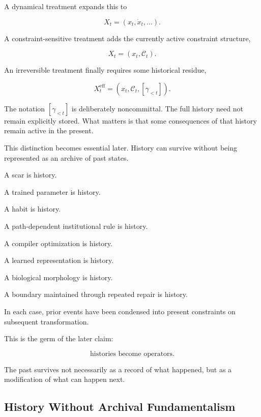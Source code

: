 \documentclass[11pt]{article}
\theoremstyle{remark}
\begin{document}
A dynamical treatment expands this to

\begin{equation}
X_t
=
(x_t,\dot{x}_t,\ldots).
\end{equation}

A constraint-sensitive treatment adds the currently active constraint structure,

\begin{equation}
X_t
=
(x_t,\mathcal{C}_t).
\end{equation}

An irreversible treatment finally requires some historical residue,

\begin{equation}
X_t^{\mathrm{eff}}
=
(x_t,\mathcal{C}_t,[\gamma_{<t}]).
\end{equation}

The notation $[\gamma_{<t}]$ is deliberately noncommittal. The full history need not remain explicitly stored. What matters is that some consequences of that history remain active in the present.

This distinction becomes essential later. History can survive without being represented as an archive of past states.

A scar is history.

A trained parameter is history.

A habit is history.

A path-dependent institutional rule is history.

A compiler optimization is history.

A learned representation is history.

A biological morphology is history.

A boundary maintained through repeated repair is history.

In each case, prior events have been condensed into present constraints on subsequent transformation.

This is the germ of the later claim:

\begin{equation}
\boxed{
\text{histories become operators}.
}
\end{equation}

The past survives not necessarily as a record of what happened, but as a modification of what can happen next.

\subsection{History Without Archival Fundamentalism}
\end{document}
